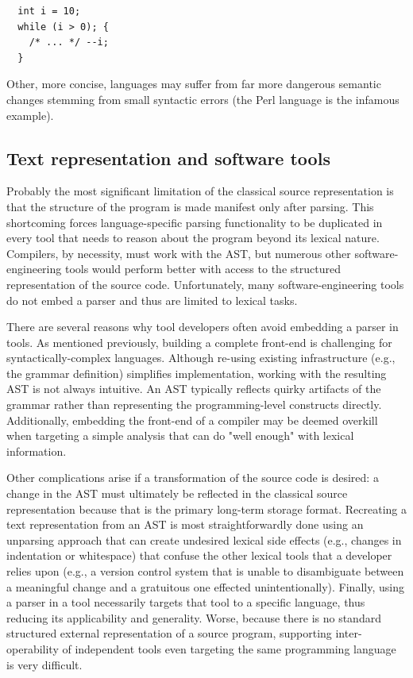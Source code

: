 \documentclass{article}
\begin{document}
\begin{multicols}{2}
{\small
\begin{verbatim}
  int i = 10;
  while (i > 0); {
    /* ... */ --i;
  }
\end{verbatim}
}

\noindent Other, more concise, languages may suffer from far more dangerous
semantic changes stemming from small syntactic errors (the Perl language
is the infamous example).

\subsection{Text representation and software tools}

Probably the most significant limitation of the classical source
representation is that the structure of the program is made manifest
only after parsing.  This shortcoming forces language-specific parsing
functionality to be duplicated in every tool that needs to reason about
the program beyond its lexical nature.  Compilers, by necessity, must
work with the AST, but numerous other software-engineering tools would
perform better with access to the structured representation of the
source code.  Unfortunately, many software-engineering tools do not
embed a parser and thus are limited to lexical tasks.

There are several reasons why tool developers often avoid embedding a
parser in tools.  As mentioned previously, building a complete front-end
is challenging for syntactically-complex languages.  Although re-using
existing infrastructure (e.g., the grammar definition) simplifies
implementation, working with the resulting AST is not always intuitive.
An AST typically reflects quirky artifacts of the grammar rather than
representing the programming-level constructs directly.  Additionally,
embedding the front-end of a compiler may be deemed overkill when
targeting a simple analysis that can do "well enough" with lexical
information.

Other complications arise if a transformation of the source code is
desired: a change in the AST must ultimately be reflected in the
classical source representation because that is the primary long-term
storage format.  Recreating a text representation from an AST is most
straightforwardly done using an unparsing approach that can create
undesired lexical side effects (e.g., changes in indentation or
whitespace) that confuse the other lexical tools that a developer relies
upon (e.g., a version control system that is unable to disambiguate
between a meaningful change and a gratuitous one effected
unintentionally).  Finally, using a parser in a tool necessarily targets
that tool to a specific language, thus reducing its applicability and
generality.  Worse, because there is no standard structured external
representation of a source program, supporting inter-operability of
independent tools even targeting the same programming language is very
difficult.


\end{multicols}
\end{document}

